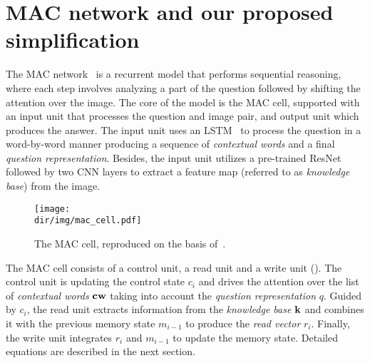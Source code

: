 \section{MAC network and our proposed simplification}
\label{sec:models}


The MAC network~\cite{hudson2018compositional} is a recurrent model that performs sequential reasoning, where each step involves analyzing a part of the question followed by shifting the attention over the image.
The core of the model is the MAC cell, supported with an input unit that processes the question and image pair, and output unit which produces the answer.
The input unit  uses an LSTM~\cite{hochreiter1997long} to process the question in a word-by-word manner producing a sequence of \emph{contextual words} and a final \emph{question representation}.
Besides, the input unit utilizes a pre-trained ResNet~\cite{he2016resnet} followed by two CNN layers to extract a feature map (referred to as \emph{knowledge base}) from the image.

\begin{wrapfigure}[10]{r}[5pt]{0.4\textwidth}
	\vspace{-15pt}
	\centering
	\texttt{[image: \\dir/img/mac\_cell.pdf]}
	\caption{The MAC cell, reproduced on the basis of~\cite{hudson2018compositional}.}
	\label{fig:mac_cell}
	\vspace{-5pt}
\end{wrapfigure}

	
The MAC cell consists of a control unit, a read unit and a write unit ().
The control unit is updating the control state $c_i$ and drives the attention over the list of \emph{contextual words} $\mathbf{cw}$ taking into account the \emph{question representation} $q$.
Guided by $c_i$,  the read unit extracts information from the \emph{knowledge base} $\mathbf{k}$ and combines it with the previous memory state $m_{i-1}$  to produce the \emph{read vector} $r_i$.
Finally, the write unit integrates $r_i$ and $m_{i-1}$ to update the memory state. Detailed equations are described in the next section.
